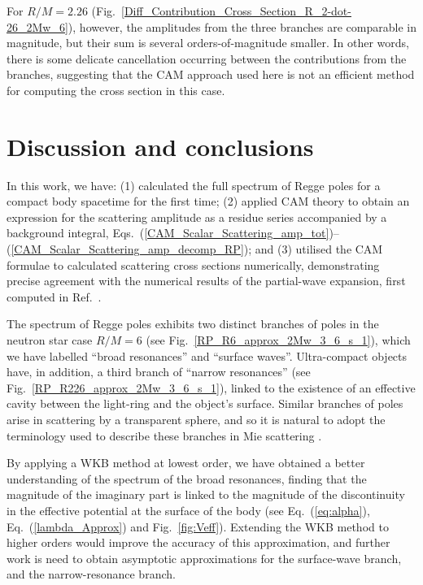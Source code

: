 \documentclass[aps,prd,longbibliography,reprint,twocolumn,amsmath,amssymb,amsfonts,showpacs,footnote,superscriptaddress]{revtex4-1}%
\begin{document}
For $R/M = 2.26$ (Fig.~\ref{Diff_Contribution_Cross_Section_R_2-dot-26_2Mw_6}), however, the amplitudes  from the three branches are comparable in magnitude, but their sum is several orders-of-magnitude smaller. In other words, there is some delicate cancellation occurring between the contributions from the branches, suggesting that the CAM approach used here is not an efficient method for computing the cross section in this case.




\section{Discussion and conclusions\label{sec:conclusions}}

In this work, we have: (1) calculated the full spectrum of Regge poles for a compact body spacetime for the first time; (2) applied CAM theory to obtain an expression for the scattering amplitude as a residue series accompanied by a background integral, Eqs.~(\ref{CAM_Scalar_Scattering_amp_tot})--(\ref{CAM_Scalar_Scattering_amp_decomp_RP}); and (3) utilised the CAM formulae to calculated scattering cross sections numerically, demonstrating precise agreement with the numerical results of the partial-wave expansion, first computed in Ref.~\cite{Dolan:2017rtj}.

The spectrum of Regge poles exhibits two distinct branches of poles in the neutron star case $R/M = 6$ (see Fig.~\ref{RP_R6_approx_2Mw_3_6_s_1}), which we have labelled ``broad resonances'' and ``surface waves''. Ultra-compact objects have, in addition, a third branch of ``narrow resonances'' (see Fig.~\ref{RP_R226_approx_2Mw_3_6_s_1}), linked to the existence of an effective cavity between the light-ring and the object's surface. Similar branches of poles arise in scattering by a transparent sphere, and so it is natural to adopt the terminology used to describe these branches in Mie scattering \cite{Nussenzveig:2006}.

By applying a WKB method at lowest order, we have obtained a better understanding of the spectrum of the broad resonances, finding that the magnitude of the imaginary part is linked to the magnitude of the discontinuity in the effective potential at the surface of the body (see Eq.~(\ref{eq:alpha}), Eq.~(\ref{lambda_Approx}) and Fig.~\ref{fig:Veff}). Extending the WKB method to higher orders would improve the accuracy of this approximation, and further work is need to obtain asymptotic approximations for the surface-wave branch, and the narrow-resonance branch.
\end{document}
